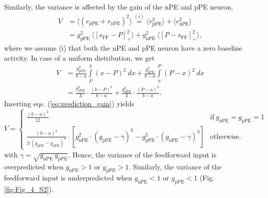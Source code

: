 \documentclass[10pt,a4paper,draft]{article}
\begin{document}
Similarly, the variance is affected by the gain of the nPE and pPE neuron,
%
\begin{align}
\label{eq:condition_variance_gain}
V &= \langle \left(r_\mathrm{pPE} + r_\mathrm{nPE}\right)^2 \rangle \overset{(i)}{=} \langle r_\mathrm{pPE}^2 \rangle + \langle r_\mathrm{nPE}^2 \rangle \nonumber\\
&=g_\mathrm{pPE}^2\ \langle \left[ s_\mathrm{FF}-P \right]_+^2 \rangle + g_\mathrm{nPE}^2\ \langle \left[ P-s_\mathrm{FF} \right]_+^2 \rangle,
\end{align}
%
where we assume (i) that both the nPE and pPE neuron have a zero baseline activity. In case of a uniform distribution, we get
%
\begin{align}
V &= \frac{g_\mathrm{pPE}^2}{b-a} \int\limits_P^b (x-P)^2\ dx + \frac{g_\mathrm{nPE}^2}{b-a} \int\limits_a^P (P-x)^2\ dx \\
   &= \frac{g_\mathrm{pPE}^2}{3} \cdot \frac{(b-P)^3}{b-a} + \frac{g_\mathrm{nPE}^2}{3} \cdot \frac{(P-a)^3}{b-a}. \nonumber
\end{align}
%
Inserting eqs. (\ref{eq:prediction_gain}) yields
%
\begin{equation}
\label{eq:variance_gain}
    V=
    \begin{cases}
      \frac{(b - a)^2}{12} & \text{if}\ g_\mathrm{nPE} = g_\mathrm{pPE} = 1 \\
      \frac{(b-a)^2}{3\ (g_\mathrm{pPE} - g_\mathrm{nPE})^3} \cdot \left[ g_\mathrm{nPE}^2 \cdot( g_\mathrm{pPE} - \gamma)^3 - g_\mathrm{pPE}^2 \cdot (g_\mathrm{nPE} - \gamma)^3\right] & \text{otherwise.}
    \end{cases}
\end{equation}
%
with $\gamma = \sqrt{g_\mathrm{nPE}\ g_\mathrm{pPE}}$. Hence, the variance of the feedforward input is overpredicted when $g_\mathrm{nPE}>1$ or $g_\mathrm{pPE}>1$. Similarly, the variance of the feedforward input is underpredicted when $g_\mathrm{nPE} < 1$ or $g_\mathrm{pPE} < 1$ (Fig. \ref{fig:Fig_4_S2}).
\end{document}
